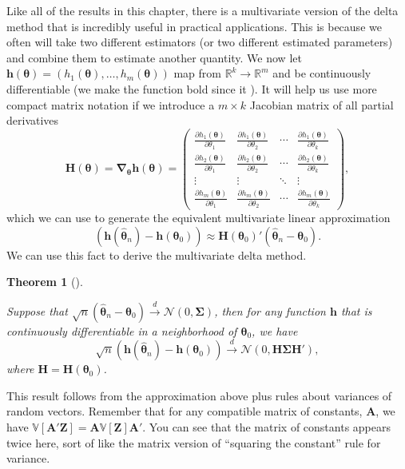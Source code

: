 \documentclass[
  letterpaper,
  DIV=11,
  numbers=noendperiod]{scrreprt}
\newcommand{\mb}{\symbf}
\newcommand{\V}{\mathbb{V}}
\newcommand{\N}{\mathcal{N}}
\newcommand{\indist}{\overset{d}{\to}}
\theoremstyle{definition}
\theoremstyle{plain}
\newtheorem{theorem}{Theorem}[chapter]
\theoremstyle{definition}
\theoremstyle{remark}
\begin{document}
Like all of the results in this chapter, there is a multivariate version
of the delta method that is incredibly useful in practical applications.
This is because we often will take two different estimators (or two
different estimated parameters) and combine them to estimate another
quantity. We now let
\(\mb{h}(\mb{\theta}) = (h_1(\mb{\theta}), \ldots, h_m(\mb{\theta}))\)
map from \(\mathbb{R}^k \to \mathbb{R}^m\) and be continuously
differentiable (we make the function bold since it ). It will help us
use more compact matrix notation if we introduce a \(m \times k\)
Jacobian matrix of all partial derivatives \[
\mb{H}(\mb{\theta}) = \mb{\nabla}_{\mb{\theta}}\mb{h}(\mb{\theta}) = \begin{pmatrix}
  \frac{\partial h_1(\mb{\theta})}{\partial \theta_1} & \frac{\partial h_1(\mb{\theta})}{\partial \theta_2} & \cdots & \frac{\partial h_1(\mb{\theta})}{\partial \theta_k} \\
  \frac{\partial h_2(\mb{\theta})}{\partial \theta_1} & \frac{\partial h_2(\mb{\theta})}{\partial \theta_2} & \cdots & \frac{\partial h_2(\mb{\theta})}{\partial \theta_k} \\
  \vdots & \vdots & \ddots & \vdots \\
  \frac{\partial h_m(\mb{\theta})}{\partial \theta_1} & \frac{\partial h_m(\mb{\theta})}{\partial \theta_2} & \cdots & \frac{\partial h_m(\mb{\theta})}{\partial \theta_k} 
\end{pmatrix},
\] which we can use to generate the equivalent multivariate linear
approximation \[
\left(\mb{h}(\widehat{\mb{\theta}}_n) - \mb{h}(\mb{\theta}_0)\right) \approx \mb{H}(\mb{\theta}_0)'\left(\widehat{\mb{\theta}}_n - \mb{\theta}_0\right).
\] We can use this fact to derive the multivariate delta method.

\leavevmode{}%
\begin{theorem}[]\label{thm-multivariate-delta}

Suppose that
\(\sqrt{n}\left(\widehat{\mb{\theta}}_n - \mb{\theta}_0 \right) \indist \N(0, \mb{\Sigma})\),
then for any function \(\mb{h}\) that is continuously differentiable in
a neighborhood of \(\mb{\theta}_0\), we have \[
\sqrt{n}\left(\mb{h}(\widehat{\mb{\theta}}_n) - \mb{h}(\mb{\theta}_0) \right) \indist \N(0, \mb{H}\mb{\Sigma}\mb{H}'), 
\] where \(\mb{H} = \mb{H}(\mb{\theta}_0)\).

\end{theorem}

This result follows from the approximation above plus rules about
variances of random vectors. Remember that for any compatible matrix of
constants, \(\mb{A}\), we have
\(\V[\mb{A}'\mb{Z}] = \mb{A}\V[\mb{Z}]\mb{A}'\). You can see that the
matrix of constants appears twice here, sort of like the matrix version
of ``squaring the constant'' rule for variance.
\end{document}
